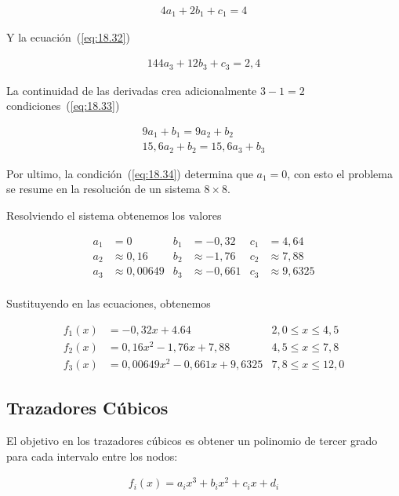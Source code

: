 \documentclass[conference]{IEEEtran}
\begin{document}
\begin{align*}
	4a_{1} + 2b_{1} + c_{1} = 4
\end{align*}

Y la ecuación~(\ref{eq:18.32})

\begin{align*}
	144a_{3} + 12b_{3} + c_{3} = 2,4
\end{align*}

La continuidad de las derivadas crea adicionalmente $3 - 1 = 2$ condiciones~(\ref{eq:18.33})

\begin{align*}
	9a_{1} + b_{1} = 9a_{2} + b_{2} \\
	15,6a_{2} + b_{2} = 15,6a_{3} + b_{3}
\end{align*}

Por ultimo, la condición~(\ref{eq:18.34}) determina que $a_{1} = 0$, con esto
el problema se resume en la resolución de un sistema $8 \times 8$.

Resolviendo el sistema obtenemos los valores

\begin{align*}
	a_{1} & = 0             & b_{1} & = -0,32        & c_{1} & = 4,64         \\
	a_{2} & \approx  0,16   & b_{2} & \approx -1,76  & c_{2} & \approx 7,88   \\
	a_{3} & \approx 0,00649 & b_{3} & \approx -0,661 & c_{3} & \approx 9,6325 \\
\end{align*}

Sustituyendo en las ecuaciones, obtenemos

\begin{align*}
	f_{1}(x) & = -0,32x + 4.64                  & 2,0 \leq x \leq 4,5  \\
	f_{2}(x) & = 0,16x^{2} - 1,76x + 7,88       & 4,5 \leq x \leq 7,8  \\
	f_{3}(x) & = 0,00649x^{2} - 0,661x + 9,6325 & 7,8 \leq x \leq 12,0
\end{align*}

\subsection{Trazadores Cúbicos}

El objetivo en los trazadores cúbicos es obtener un polinomio de tercer grado
para cada intervalo entre los nodos:

\begin{align}
	f_{i}(x) = a_{i}x^{3} + b_{i}x^{2} + c_{i}x + d_{i}
	\label{eq:18.35}
\end{align}
\end{document}
